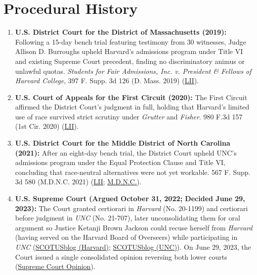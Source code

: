 \documentclass[12pt]{article}
\begin{document}
\section{Procedural History}

\begin{enumerate}
\item \textbf{U.S. District Court for the District of Massachusetts (2019):} Following a 15-day bench trial featuring testimony from 30 witnesses, Judge Allison D. Burroughs upheld Harvard's admissions program under Title VI and existing Supreme Court precedent, finding no discriminatory animus or unlawful quotas. \textit{Students for Fair Admissions, Inc. v. President \& Fellows of Harvard College}, 397 F. Supp. 3d 126 (D. Mass. 2019) (\href{https://www.law.cornell.edu/supremecourt/text/20-1199}{LII}).
\item \textbf{U.S. Court of Appeals for the First Circuit (2020):} The First Circuit affirmed the District Court's judgment in full, holding that Harvard's limited use of race survived strict scrutiny under \textit{Grutter} and \textit{Fisher}. 980 F.3d 157 (1st Cir. 2020) (\href{https://www.law.cornell.edu/supremecourt/text/20-1199}{LII}).
\item \textbf{U.S. District Court for the Middle District of North Carolina (2021):} After an eight-day bench trial, the District Court upheld UNC's admissions program under the Equal Protection Clause and Title VI, concluding that race-neutral alternatives were not yet workable. 567 F. Supp. 3d 580 (M.D.N.C. 2021) (\href{https://www.law.cornell.edu/supremecourt/text/20-1199}{LII}; \href{https://www.ncmd.uscourts.gov/students-fair-admissions-inc-v-president-fellows-harvard-college}{M.D.N.C.}).
\item \textbf{U.S. Supreme Court (Argued October 31, 2022; Decided June 29, 2023):} The Court granted certiorari in \textit{Harvard} (No. 20-1199) and certiorari before judgment in \textit{UNC} (No. 21-707), later unconsolidating them for oral argument so Justice Ketanji Brown Jackson could recuse herself from \textit{Harvard} (having served on the Harvard Board of Overseers) while participating in \textit{UNC} (\href{https://www.scotusblog.com/cases/students-for-fair-admissions-inc-v-president-fellows-of-harvard-college/}{SCOTUSblog (Harvard)}; \href{https://www.scotusblog.com/cases/students-for-fair-admissions-inc-v-university-of-north-carolina/}{SCOTUSblog (UNC)}). On June 29, 2023, the Court issued a single consolidated opinion reversing both lower courts (\href{https://www.supremecourt.gov/opinions/22pdf/20-1199_hgdj.pdf}{Supreme Court Opinion}).
\end{enumerate}
\end{document}
